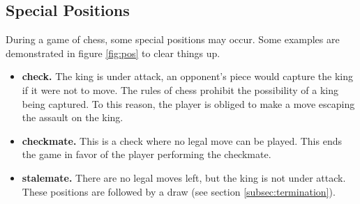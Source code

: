 \subsection{Special Positions}
\label{subsec:special_pos}
During a game of chess, some special positions may occur. Some examples are demonstrated in figure \ref{fig:pos} to clear things up.
\begin{itemize}
\item \textbf{check.} The king is under attack, an opponent's piece would capture the king if it were not to move. The rules of chess prohibit the possibility of a king being captured. To this reason, the player is obliged to make a move escaping the assault on the king.
\item \textbf{checkmate.} This is a check where no legal move can be played. This ends the game in favor of the player performing the checkmate.
\item \textbf{stalemate.} There are no legal moves left, but the king is not under attack. These positions are followed by a draw (see section \ref{subsec:termination}).
\end{itemize}

